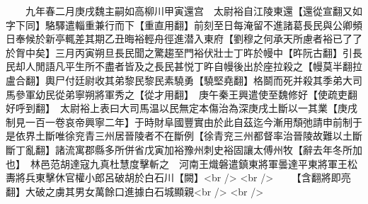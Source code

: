 　　九年春二月庚戌魏主嗣如高柳川甲寅還宫　太尉裕自江陵東還【還從宣翻又如字下同】駱驛遣輜重兼行而下【重直用翻】前刻至日每淹留不進諸葛長民與公卿頻日奉候於新亭輒差其期乙丑晦裕輕舟徑進潜入東府【劉穆之何承天所慮者裕已了了於胷中矣】三月丙寅朔旦長民聞之驚趨至門裕伏壯士丁旿於幔中【旿阮古翻】引長民却人閒語凡平生所不盡者皆及之長民甚悦丁旿自幔後出於座拉殺之【幔莫半翻拉盧合翻】輿尸付廷尉收其弟黎民黎民素驍勇【驍堅堯翻】格鬬而死并殺其季弟大司馬參軍幼民從弟寧朔將軍秀之【從才用翻】　庚午秦王興遣使至魏修好【使疏吏翻好呼到翻】　太尉裕上表曰大司馬温以民無定本傷治為深庚戌土斷以一其業【庚戌制見一百一卷哀帝興寧二年】于時財阜國豐實由於此自茲迄今漸用頹弛請申前制于是依界土斷唯徐兖青三州居晉陵者不在斷例【徐青兖三州都督率治晉陵故難以土斷斷丁亂翻】諸流寓郡縣多所併省戊寅加裕豫州刺史裕固讓太傅州牧【辭去年冬所加也】　林邑范胡達寇九真杜慧度擊斬之　河南王熾磐遣鎮東將軍曇達平東將軍王松夀將兵東擊休官權小郎呂破胡於白石川【闕】<br />
<br />
　　【含翻將即亮翻】大破之虜其男女萬餘口進據白石城顯親<br />
<br />
